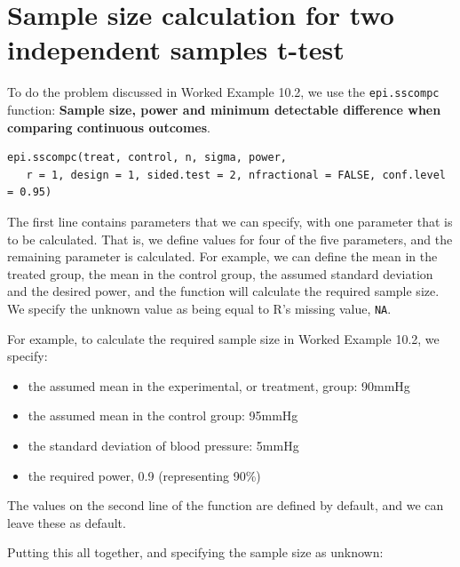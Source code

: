 \documentclass[
]{memoir}
\providecommand{\tightlist}{%
  \setlength{\itemsep}{0pt}\setlength{\parskip}{0pt}}
\begin{document}
\hypertarget{sample-size-calculation-for-two-independent-samples-t-test}{%
\section{Sample size calculation for two independent samples t-test}\label{sample-size-calculation-for-two-independent-samples-t-test}}

To do the problem discussed in Worked Example 10.2, we use the \texttt{epi.sscompc} function: \textbf{Sample size, power and minimum detectable difference when comparing continuous outcomes}.

\begin{verbatim}
epi.sscompc(treat, control, n, sigma, power, 
   r = 1, design = 1, sided.test = 2, nfractional = FALSE, conf.level = 0.95)
\end{verbatim}

The first line contains parameters that we can specify, with one parameter that is to be calculated. That is, we define values for four of the five parameters, and the remaining parameter is calculated. For example, we can define the mean in the treated group, the mean in the control group, the assumed standard deviation and the desired power, and the function will calculate the required sample size. We specify the unknown value as being equal to R's missing value, \texttt{NA}.

For example, to calculate the required sample size in Worked Example 10.2, we specify:

\begin{itemize}
\tightlist
\item
  the assumed mean in the experimental, or treatment, group: 90mmHg
\item
  the assumed mean in the control group: 95mmHg
\item
  the standard deviation of blood pressure: 5mmHg
\item
  the required power, 0.9 (representing 90\%)
\end{itemize}

The values on the second line of the function are defined by default, and we can leave these as default.

Putting this all together, and specifying the sample size as unknown:
\end{document}
